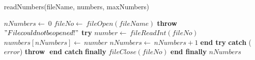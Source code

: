 \documentclass[a4paper,10pt]{article}
\begin{document}
\begin{algorithm}
\caption{readNumbers(fileName, numbers, maxNumbers)}
\begin{algorithmic}[5]

\STATE {}
\STATE {}
\STATE {}
  \STATE \(nNumbers\gets\ 0\)
  \STATE \(fileNo\gets\ fileOpen(fileName)\)
    \STATE \textbf{throw} \("File could not be opened!"\)
  \ENDIF
  \STATE \textbf{try}  \BODY
      \STATE \(number\gets\ fileReadInt(fileNo)\)
      \STATE \(numbers[nNumbers]\gets\ number\)
      \STATE \(nNumbers\gets\ nNumbers+1\)
    \ENDWHILE
  \ENDBODY \STATE \textbf{end try}
  \STATE \textbf{catch} (\(error\)) \BODY
    \STATE \textbf{throw} \(\)
  \ENDBODY \STATE \textbf{end catch}
  \STATE \textbf{finally} \BODY
    \STATE \(fileClose(fileNo)\)
  \ENDBODY \STATE \textbf{end finally}
  \RETURN\(nNumbers\)

\end{algorithmic}
\end{algorithm}
\end{document}
